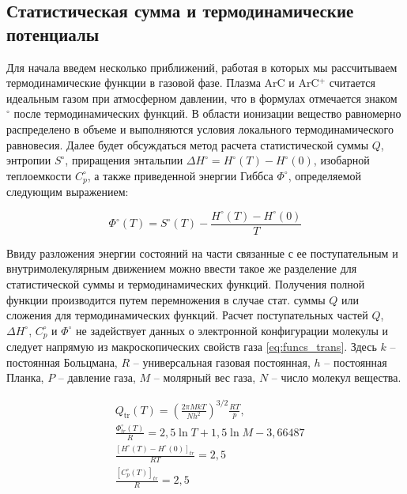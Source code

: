 \documentclass[12pt]{extarticle}
\begin{document}
    \subsection{Статистическая сумма и термодинамические потенциалы}
    \label{sec:Chapter2.2}
    
    Для начала введем несколько приближений, работая в которых мы рассчитываем термодинамические функции в газовой фазе. Плазма ArC и ArC$^+$ считается идеальным газом при атмосферном давлении, что в формулах отмечается знаком $^\circ$ после термодинамических функций. В области ионизации вещество равномерно распределено в объеме и выполняются условия локального термодинамического равновесия. Далее будет обсуждаться метод расчета статистической суммы $Q$, энтропии $S^\circ$, приращения энтальпии $\Delta H^\circ = H^\circ(T) - H^\circ(0)$, изобарной теплоемкости $C_p^\circ$, а также приведенной энергии Гиббса $\Phi^\circ$, определяемой следующим выражением:
    
    \begin{equation}
    	\Phi^{\circ}(T)=S^{\circ}(T)-\frac{H^{\circ}(T)-H^{\circ}(0)}{T}
    \end{equation}
    
    Ввиду разложения энергии состояний на части связанные с ее поступательным и внутримолекулярным движением можно ввести такое же разделение для статистической суммы и термодинамических функций. Получения полной функции производится путем перемножения в случае стат. суммы $Q$ или сложения для термодинамических функций. Расчет поступательных частей $Q$, $\Delta H^\circ$, $C_p^\circ$ и $\Phi^\circ$ не задействует данных о электронной конфигурации молекулы и следует напрямую из макроскопических свойств газа \ref{eq:funcs_trans}. Здесь $k$ -- постоянная Больцмана, $R$ -- универсальная газовая постоянная, $h$ -- постоянная Планка, $P$ -- давление газа, $M$ -- молярный вес газа,  $N$ -- число молекул вещества.
    
    \begin{equation}\label{eq:funcs_trans}
    	\begin{split}
    		&Q_{\text {tr}}(T)=\left(\frac{2 \pi M k T}{N h^2}\right)^{3 / 2} \frac{R T}{p}, \\
 		    &\frac{\Phi_{t r}^\circ(T)}{R}=2,5 \ln T+1,5 \ln M-3,66487 \\
    		&\frac{\left[H^\circ(T)-H^\circ(0)\right]_{t r}}{R T}=2,5 \\
    		&\frac{\left[C_p^\circ(T)\right]_{t r}}{R}=2,5
    	\end{split}
    \end{equation}
    
\end{document}
